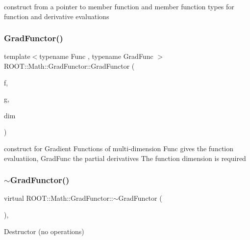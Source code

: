 construct from a pointer to member function and member function types for function and derivative evaluations \mbox{\label{classROOT_1_1Math_1_1GradFunctor_a079a63821986eb0ce6e011c366c1cb9a}} 
\subsubsection{\texorpdfstring{GradFunctor()}{GradFunctor()}\hspace{0.1cm}{\footnotesize\ttfamily [9/10]}}
{\footnotesize\ttfamily template$<$typename Func , typename Grad\+Func $>$ \\
R\+O\+O\+T\+::\+Math\+::\+Grad\+Functor\+::\+Grad\+Functor (\begin{DoxyParamCaption}\item[{const Func \&}]{f,  }\item[{const Grad\+Func \&}]{g,  }\item[{int}]{dim }\end{DoxyParamCaption})\hspace{0.3cm}{\ttfamily [inline]}}

construct for Gradient Functions of multi-\/dimension Func gives the function evaluatiion, Grad\+Func the partial derivatives The function dimension is required \mbox{\label{classROOT_1_1Math_1_1GradFunctor_a1dfc4e8382f679a935eae97c5e7ee4dd}} 
\subsubsection{\texorpdfstring{$\sim$GradFunctor()}{~GradFunctor()}\hspace{0.1cm}{\footnotesize\ttfamily [2/2]}}
{\footnotesize\ttfamily virtual R\+O\+O\+T\+::\+Math\+::\+Grad\+Functor\+::$\sim$\+Grad\+Functor (\begin{DoxyParamCaption}{ }\end{DoxyParamCaption})\hspace{0.3cm}{\ttfamily [inline]}, {\ttfamily [virtual]}}

Destructor (no operations) \mbox{\label{classROOT_1_1Math_1_1GradFunctor_a629b55d9f326dbf39e5c3ccfb4678579}} 
